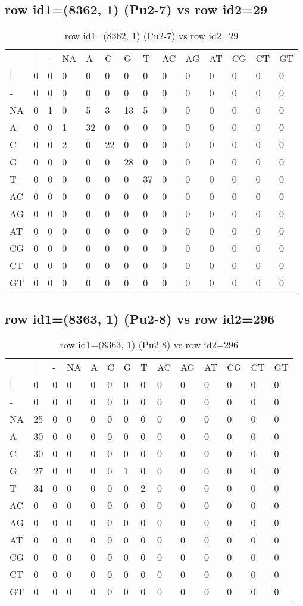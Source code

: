 \subsection{row id1=(8362, 1) (Pu2-7) vs row id2=29}
\begin{center}
\begin{longtable}{|l|l|l|l|l|l|l|l|l|l|l|l|l|l|}
\caption{row id1=(8362, 1) (Pu2-7) vs row id2=29} \label{table_dm590}\\
\hline
\\
\hline
&$|$&-&NA&A&C&G&T&AC&AG&AT&CG&CT&GT\\
$|$&0&0&0&0&0&0&0&0&0&0&0&0&0\\
-&0&0&0&0&0&0&0&0&0&0&0&0&0\\
NA&0&1&0&5&3&13&5&0&0&0&0&0&0\\
A&0&0&1&32&0&0&0&0&0&0&0&0&0\\
C&0&0&2&0&22&0&0&0&0&0&0&0&0\\
G&0&0&0&0&0&28&0&0&0&0&0&0&0\\
T&0&0&0&0&0&0&37&0&0&0&0&0&0\\
AC&0&0&0&0&0&0&0&0&0&0&0&0&0\\
AG&0&0&0&0&0&0&0&0&0&0&0&0&0\\
AT&0&0&0&0&0&0&0&0&0&0&0&0&0\\
CG&0&0&0&0&0&0&0&0&0&0&0&0&0\\
CT&0&0&0&0&0&0&0&0&0&0&0&0&0\\
GT&0&0&0&0&0&0&0&0&0&0&0&0&0\\
\hline
\end{longtable}
\end{center}

\subsection{row id1=(8363, 1) (Pu2-8) vs row id2=296}
\begin{center}
\begin{longtable}{|l|l|l|l|l|l|l|l|l|l|l|l|l|l|}
\caption{row id1=(8363, 1) (Pu2-8) vs row id2=296} \label{table_dm592}\\
\hline
\\
\hline
&$|$&-&NA&A&C&G&T&AC&AG&AT&CG&CT&GT\\
$|$&0&0&0&0&0&0&0&0&0&0&0&0&0\\
-&0&0&0&0&0&0&0&0&0&0&0&0&0\\
NA&25&0&0&0&0&0&0&0&0&0&0&0&0\\
A&30&0&0&0&0&0&0&0&0&0&0&0&0\\
C&30&0&0&0&0&0&0&0&0&0&0&0&0\\
G&27&0&0&0&0&1&0&0&0&0&0&0&0\\
T&34&0&0&0&0&0&2&0&0&0&0&0&0\\
AC&0&0&0&0&0&0&0&0&0&0&0&0&0\\
AG&0&0&0&0&0&0&0&0&0&0&0&0&0\\
AT&0&0&0&0&0&0&0&0&0&0&0&0&0\\
CG&0&0&0&0&0&0&0&0&0&0&0&0&0\\
CT&0&0&0&0&0&0&0&0&0&0&0&0&0\\
GT&0&0&0&0&0&0&0&0&0&0&0&0&0\\
\hline
\end{longtable}
\end{center}

